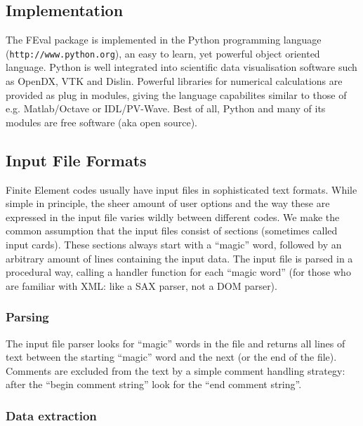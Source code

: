 \subsection{Implementation}
\label{sec:implementation}

The FEval package is implemented in the Python programming language
(\texttt{http://www.python.org}), an easy to learn, yet powerful object
oriented language.  Python is well integrated into scientific data
visualisation software such as OpenDX, VTK and Dislin.  Powerful libraries for
numerical calculations are provided as plug in modules, giving the language
capabilites similar to those of e.g. Matlab/Octave or IDL/PV-Wave. Best of
all, Python and many of its modules are free software (aka open source).

\subsection{Input File Formats}
\label{sec:input-file-formats}

Finite Element codes usually have input files in sophisticated text formats.
While simple in principle, the sheer amount of user options and the way these
are expressed in the input file varies wildly between different codes. We make
the common assumption that the input files consist of sections (sometimes
called input cards). These sections always start with a ``magic'' word,
followed by an arbitrary amount of lines containing the input data.  The input
file is parsed in a procedural way, calling a handler function for each
``magic word'' (for those who are familiar with XML: like a SAX parser, not a
DOM parser).

\subsubsection{Parsing}
\label{sec:input-file-parsing}

The input file parser looks for ``magic'' words in the file and returns all
lines of text between the starting ``magic'' word and the next (or the end of
the file). Comments are excluded from the text by a simple comment handling
strategy: after the ``begin comment string'' look for the ``end comment
string''.

\subsubsection{Data extraction}
\label{sec:data-extraction}

